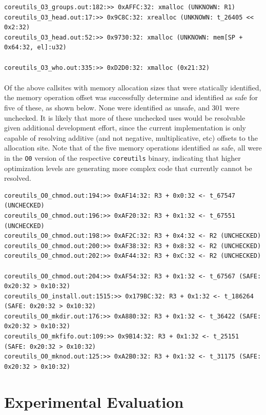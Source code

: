 \documentclass[letterpaper,11pt]{article}
\begin{document}
\begin{verbatim}
coreutils_O3_groups.out:182:>> 0xAFFC:32: xmalloc (UNKNOWN: R1)
coreutils_O3_head.out:17:>> 0x9C8C:32: xrealloc (UNKNOWN: t_26405 << 0x2:32)
coreutils_O3_head.out:52:>> 0x9730:32: xmalloc (UNKNOWN: mem[SP + 0x64:32, el]:u32)

coreutils_O3_who.out:335:>> 0xD2D0:32: xmalloc (0x21:32)
\end{verbatim}

\paragraph{}
Of the above callsites with memory allocation sizes that were statically
identified, the memory operation offset was successfully determine and
identified as safe for five of these, as shown below. None were identified as
unsafe, and 301 were unchecked. It is likely that more of these unchecked uses
would be resolvable given additional development effort, since the current
implementation is only capable of resolving additive (and not negative,
multiplicative, etc) offsets to the allocation site. Note that of the five
memory operations identified as safe, all were in the \texttt{O0} version of the
respective \texttt{coreutils} binary, indicating that higher optimization levels are
generating more complex code that currently cannot be resolved.

\small
\begin{verbatim}
coreutils_O0_chmod.out:194:>> 0xAF14:32: R3 + 0x0:32 <- t_67547 (UNCHECKED)
coreutils_O0_chmod.out:196:>> 0xAF20:32: R3 + 0x1:32 <- t_67551 (UNCHECKED)
coreutils_O0_chmod.out:198:>> 0xAF2C:32: R3 + 0x4:32 <- R2 (UNCHECKED)
coreutils_O0_chmod.out:200:>> 0xAF38:32: R3 + 0x8:32 <- R2 (UNCHECKED)
coreutils_O0_chmod.out:202:>> 0xAF44:32: R3 + 0xC:32 <- R2 (UNCHECKED)

coreutils_O0_chmod.out:204:>> 0xAF54:32: R3 + 0x1:32 <- t_67567 (SAFE: 0x20:32 > 0x10:32)
coreutils_O0_install.out:1515:>> 0x179BC:32: R3 + 0x1:32 <- t_186264 (SAFE: 0x20:32 > 0x10:32)
coreutils_O0_mkdir.out:176:>> 0xA880:32: R3 + 0x1:32 <- t_36422 (SAFE: 0x20:32 > 0x10:32)
coreutils_O0_mkfifo.out:109:>> 0x9B14:32: R3 + 0x1:32 <- t_25151 (SAFE: 0x20:32 > 0x10:32)
coreutils_O0_mknod.out:125:>> 0xA2B0:32: R3 + 0x1:32 <- t_31175 (SAFE: 0x20:32 > 0x10:32)
\end{verbatim}
\normalsize


\section{Experimental Evaluation}
\end{document}
